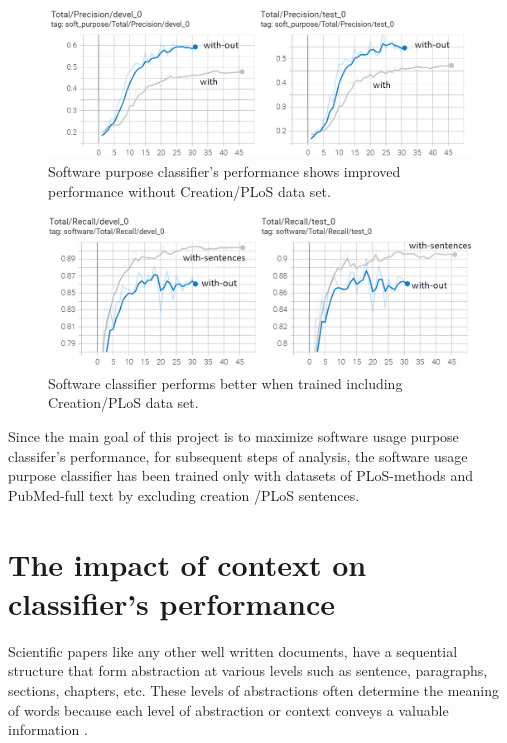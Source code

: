 \begin{figure}[htbp]
	\centering
	\includegraphics[width=.90\textwidth]{4.graphics/figures/ch_6/1.with_sent_vs_without/HD/1}
	\caption{Software purpose classifier's performance shows improved performance without Creation/PLoS data set.}
	\label{fig:chapter06:without}
\end{figure}


\begin{figure}[htbp]
	\centering
	\includegraphics[width=.90\textwidth]{4.graphics/figures/ch_6/1.with_sent_vs_without/HD/2}
	\caption{Software classifier performs better when trained including Creation/PLoS data set.}
	\label{fig:chapter06:with}
\end{figure}

Since the main goal of this project is to maximize software usage purpose classifer’s performance, for subsequent steps of analysis, the software usage purpose classifier has been trained only with datasets of PLoS-methods and PubMed-full text by excluding creation /PLoS sentences. 

\section{The impact of context on classifier’s performance }
\label{sec:chapter06:context}

Scientific papers like any other well written documents, have a sequential structure that form abstraction at various levels such as sentence, paragraphs, sections, chapters, etc. These levels of abstractions often determine the meaning of words because each level of abstraction or context conveys a valuable information \citep{ghosh2016contextual}. \\

